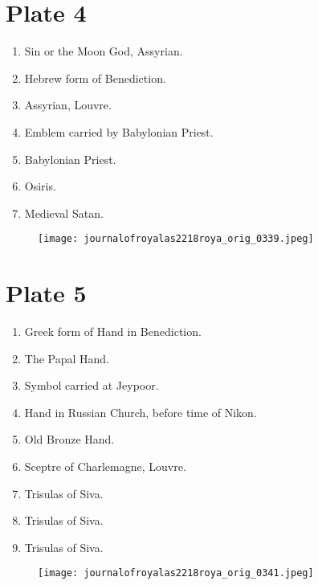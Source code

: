 \documentclass[a4paper, 11pt, oneside, english]{article}
\begin{document}
\section*{Plate 4}
\begin{enumerate}
    \item Sin or the Moon God, Assyrian.

    \item Hebrew form of Benediction.

    \item Assyrian, Louvre.

    \item Emblem carried by Babylonian Priest.

    \item Babylonian Priest.

    \item Osiris.

    \item Medieval Satan.
\end{enumerate}
\vspace*{\fill}  
\clearpage
\clearpage
\vspace*{\fill}  
\begin{figure}[H]
\centering
\texttt{[image: journalofroyalas2218roya\_orig\_0339.jpeg]}
\end{figure}
\vspace*{\fill} 
\clearpage
{}
\vspace*{\fill}  
\section*{Plate 5}
\begin{enumerate}
    \item Greek form of Hand in Benediction.

    \item The Papal Hand.

    \item Symbol carried at Jeypoor.

    \item Hand in Russian Church, before time of Nikon.

    \item Old Bronze Hand.

    \item Sceptre of Charlemagne, Louvre.

    \item Trisulas of Siva.

    \item Trisulas of Siva.

    \item Trisulas of Siva.
\end{enumerate}
\vspace*{\fill}  
\clearpage
\clearpage
\vspace*{\fill}  
\begin{figure}[H]
\centering
\texttt{[image: journalofroyalas2218roya\_orig\_0341.jpeg]}
\end{figure}
\vspace*{\fill} 
\clearpage
\end{document}
